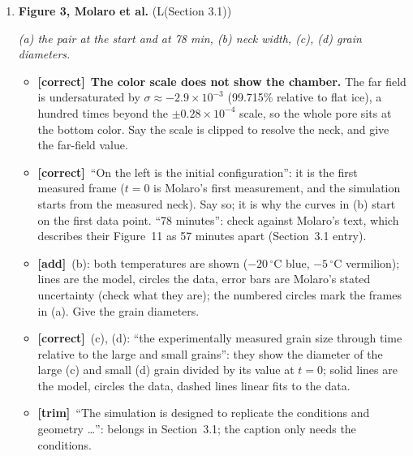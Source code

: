 \documentclass[11pt]{article}
\newcommand{\Pg}[3]{\item \textbf{#1} {\small(#2)}\par\textit{#3}}
\newcommand{\tC}{\textcolor{miss}{\textbf{[correct]}}\ }
\newcommand{\tG}{\textcolor{stale}{\textbf{[wording]}}\ }
\newcommand{\tT}{\textcolor{cut}{\textbf{[trim]}}\ }
\newcommand{\tA}{\textcolor{have}{\textbf{[add]}}\ }
\begin{document}
\begin{enumerate}
\begin{itemize}
  \item \tA (c): the black contours are the ice--air interface; only the
    $x$ cell problem is shown ($\mathbf{t}$ has a second component from the
    $y$ problem). Missing period after (c).
  \item \tA (d): color is on a logarithmic scale; ``per unit mean gradient
    in the $x$ direction'' is right; ``brightness of the path'':
    ``brighter paths carry more heat''.
  \item \tG ``the mesh in which we solve our homogenization model over'':
    ``the mesh on which the cell problem is solved''.
  \end{itemize}
\Pg{Figure 3, Molaro et al.}{L(Section 3.1)}{(a) the pair at the start and at 78 min, (b) neck width, (c), (d) grain diameters.}
  \begin{itemize}
  \item \tC \textbf{The color scale does not show the chamber.} The far
    field is undersaturated by $\sigma \approx -2.9\times10^{-3}$ (99.715\%
    relative to flat ice), a hundred times beyond the $\pm0.28\times10^{-4}$
    scale, so the whole pore sits at the bottom color. Say the scale is
    clipped to resolve the neck, and give the far-field value.
  \item \tC ``On the left is the initial configuration'': it is the first
    measured frame ($t = 0$ is Molaro's first measurement, and the
    simulation starts from the measured neck). Say so; it is why the curves
    in (b) start on the first data point. ``78 minutes'': check against
    Molaro's text, which describes their Figure~11 as 57 minutes apart
    (Section~3.1 entry).
  \item \tA (b): both temperatures are shown ($-20\,^{\circ}$C blue,
    $-5\,^{\circ}$C vermilion); lines are the model, circles the data, error
    bars are Molaro's stated uncertainty (check what they are); the numbered
    circles mark the frames in (a). Give the grain diameters.
  \item \tC (c), (d): ``the experimentally measured grain size through time
    relative to the large and small grains'': they show the diameter of the
    large (c) and small (d) grain divided by its value at $t = 0$; solid
    lines are the model, circles the data, dashed lines linear fits to the
    data.
  \item \tT ``The simulation is designed to replicate the conditions and
    geometry \ldots'': belongs in Section~3.1; the caption only needs the
    conditions.
  \end{itemize}

\end{enumerate}
\end{document}
